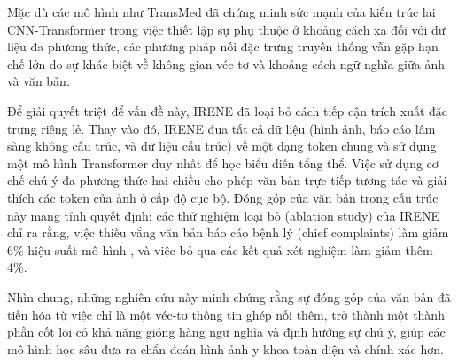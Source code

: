 Mặc dù các mô hình như TransMed \cite{TransMed} đã chứng minh sức mạnh của kiến trúc lai CNN-Transformer trong việc thiết lập sự phụ thuộc ở khoảng cách xa đối với dữ liệu đa phương thức, các phương pháp nối đặc trưng truyền thống vẫn gặp hạn chế lớn do sự khác biệt về không gian véc-tơ và khoảng cách ngữ nghĩa giữa ảnh và văn bản. 

Để giải quyết triệt để vấn đề này, IRENE \cite{IRENE} đã loại bỏ cách tiếp cận trích xuất đặc trưng riêng lẻ. Thay vào đó, IRENE đưa tất cả dữ liệu (hình ảnh, báo cáo lâm sàng không cấu trúc, và dữ liệu cấu trúc) về một dạng token chung và sử dụng một mô hình Transformer duy nhất để học biểu diễn tổng thể. Việc sử dụng cơ chế chú ý đa phương thức hai chiều cho phép văn bản trực tiếp tương tác và giải thích các token của ảnh ở cấp độ cục bộ. Đóng góp của văn bản trong cấu trúc này mang tính quyết định: các thử nghiệm loại bỏ (ablation study) của IRENE chỉ ra rằng, việc thiếu vắng văn bản báo cáo bệnh lý (chief complaints) làm giảm 6\% hiệu suất mô hình , và việc bỏ qua các kết quả xét nghiệm làm giảm thêm 4\%.  

Nhìn chung, những nghiên cứu này minh chứng rằng sự đóng góp của văn bản đã tiến hóa từ việc chỉ là một véc-tơ thông tin ghép nối thêm, trở thành một thành phần cốt lõi có khả năng gióng hàng ngữ nghĩa và định hướng sự chú ý, giúp các mô hình học sâu đưa ra chẩn đoán hình ảnh y khoa toàn diện và chính xác hơn.


